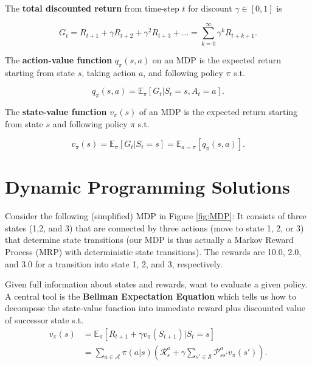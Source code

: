 \noindent The \textbf{total discounted return} from time-step $t$ for discount $\gamma \in [0,1]$ is

\begin{equation}
    G_t = R_{t+1} + \gamma R_{t+2} + \gamma^2 R_{t+3} + \ldots = \sum_{k=0}^{\infty}\gamma^k R_{t+k+1}.
\end{equation}

The \textbf{action-value function} $q_{\pi}(s,a)$ on an MDP is the expected return starting from state $s$, taking action $a$, and following policy $\pi$ s.t.

\begin{equation}
   q_{\pi}(s,a) = \mathbb{E}_{\pi}[G_t | S_t = s, A_t = a].
\end{equation}

The \textbf{state-value function} $v_{\pi}(s)$ of an MDP is the expected return starting from state $s$ and following policy $\pi$ s.t.

\begin{equation}
    v_{\pi}(s) = \mathbb{E}_{\pi}[G_t | S_t = s] = \mathbb{E}_{a \sim \pi}[q_{\pi}(s,a)] .
\end{equation}

    
\section{Dynamic Programming Solutions}

Consider the following (simplified) MDP in Figure \ref{fig:MDP}: It consists of three states (1,2, and 3) that are connected by three actions (move to state 1, 2, or 3) that determine state transitions (our MDP is thus actually a Markov Reward Process (MRP) with deterministic state transitions). The rewards are 10.0, 2.0, and 3.0 for a transition into state 1, 2, and 3, respectively. 

Given full information about states and rewards, want to evaluate a given policy. A central tool is the \textbf{Bellman Expectation Equation} which tells us how to decompose the state-value function into immediate reward plus discounted value of successor state s.t.
\begin{align*}
    v_{\pi}(s) & = \mathbb{E}_{\pi}[R_{t+1} + \gamma v_{\pi}(S_{t+1}) | S_t = s]\\
    & = \sum_{a \in \mathcal{A}} \pi(a|s) \left( \mathcal{R}_s^a + \gamma \sum_{s' \in \mathcal{S}} \mathcal{P}_{ss'}^a v_{\pi}(s') \right).
\end{align*}

